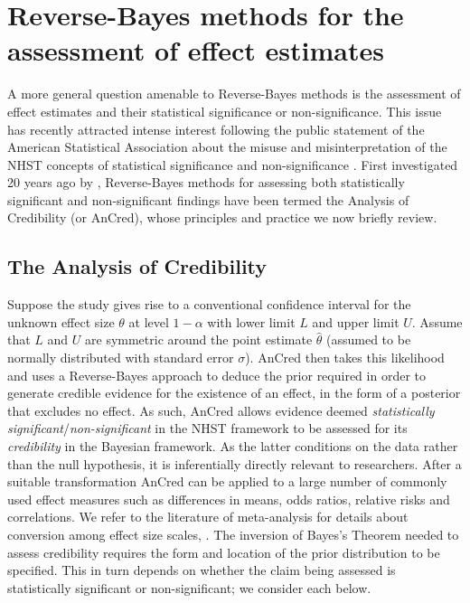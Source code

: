 \section{Reverse-Bayes methods for the assessment of effect estimates}\label{sec4:effects}
A more general question amenable to Reverse-Bayes methods is the assessment of
effect estimates and their statistical significance or non-significance. This
issue has recently attracted intense interest following the public statement of
the American Statistical Association about the misuse and misinterpretation of
the NHST concepts of statistical significance and non-significance
\citep{Wasserstein2016}. First investigated 20 years ago by
\citet{Matthews2001a, Matthews2001b}, Reverse-Bayes methods for assessing both
statistically significant and non-significant findings have been termed the
Analysis of Credibility \citep{Matthews2018} (or AnCred), whose principles and
practice we now briefly review.

\subsection{The Analysis of Credibility}
\label{sec4:AnCred}
Suppose the study gives rise to a conventional confidence interval for the
unknown effect size $\theta$ at level $1 - \alpha$ with lower limit $L$ and
upper limit $U$. Assume that $L$ and $U$ are symmetric around the point estimate
$\hat \theta$ (assumed to be normally distributed with standard error $\sigma$).
AnCred then takes this likelihood and uses a Reverse-Bayes approach to deduce
the prior required in order to generate credible evidence for the existence of
an effect, in the form of a posterior that excludes no effect. As such, AnCred
allows evidence deemed \emph{statistically significant}/\emph{non-significant}
in the NHST framework to be assessed for its \emph{credibility} in the Bayesian
framework. As the latter conditions on the data rather than the null hypothesis,
it is inferentially directly relevant to researchers. After a suitable
transformation AnCred can be applied to a large number of commonly used effect
measures such as differences in means, odds ratios, relative risks and
correlations. We refer to the literature of meta-analysis for details about
conversion among effect size scales, \eg{} \citet[chapter 11.6]{Cooper2019}. The
inversion of Bayes's Theorem needed to assess credibility requires the form and
location of the prior distribution to be specified. This in turn depends on
whether the claim being assessed is statistically significant or
non-significant; we consider each below.


